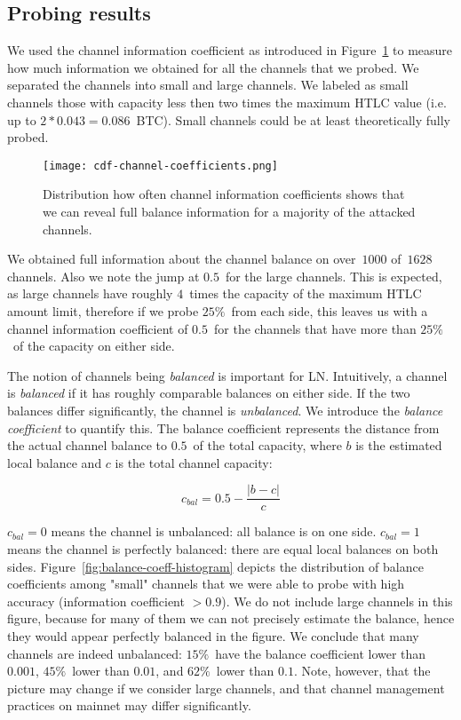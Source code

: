 \subsection{Probing results}

We used the channel information coefficient as introduced in Figure~\ref{fig:cdf-channel-coefficients} to measure how much information we obtained for all the channels that we probed.
We separated the channels into small and large channels.
We labeled as small channels those with capacity less then two times the maximum HTLC value (i.e. up to $2*0.043=0.086$~BTC). Small channels could be at least theoretically fully probed.

\begin{figure}[]
	\centering
	\texttt{[image: cdf-channel-coefficients.png]}
	\caption{Distribution how often channel information coefficients shows that we can reveal full balance information for a majority of the attacked channels.}
	\label{fig:cdf-channel-coefficients}
\end{figure}

We obtained full information about the channel balance on over~$1000$ of~$1628$ channels.
Also we note the jump at $0.5$~for the large channels.
This is expected, as large channels have roughly $4$~times the capacity of the maximum HTLC amount limit, therefore if we probe $25\%$~from each side, this leaves us with a channel information coefficient of $0.5$~for the channels that have more than $25\%$~of the capacity on either side.

The notion of channels being \textit{balanced} is important for LN.
Intuitively, a channel is \textit{balanced} if it has roughly comparable balances on either side.
If the two balances differ significantly, the channel is \textit{unbalanced}.
We introduce the \textit{balance coefficient} to quantify this.
The balance coefficient represents the distance from the actual channel balance to $0.5$~of the total capacity, where $b$ is the estimated local balance and $c$ is the total channel capacity:

\[c_{bal} = 0.5 - \frac{|b-c|}{c} \]

$c_{bal} = 0$ means the channel is unbalanced: all balance is on one side.
$c_{bal} = 1$ means the channel is perfectly balanced: there are equal local balances on both sides.
Figure~\ref{fig:balance-coeff-histogram} depicts the distribution of balance coefficients among "small" channels that we were able to probe with high accuracy (information coefficient $> 0.9$).
We do not include large channels in this figure, because for many of them we can not precisely estimate the balance, hence they would appear perfectly balanced in the figure.
We conclude that many channels are indeed unbalanced: $15\%$~have the balance coefficient lower than $0.001$, $45\%$~lower than $0.01$, and $62\%$~lower than $0.1$.
Note, however, that the picture may change if we consider large channels, and that channel management practices on mainnet may differ significantly.

